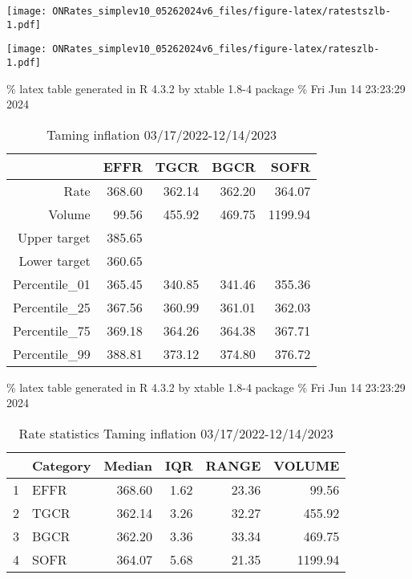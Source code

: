 \documentclass[
]{article}
\let\origfigure\figure
\let\endorigfigure\endfigure
\renewenvironment{figure}[1][2] {
    \expandafter\origfigure\expandafter[H]
} {
    \endorigfigure
}
\begin{document}
\begin{figure}
\centering
\texttt{[image: ONRates\_simplev10\_05262024v6\_files/figure-latex/ratestszlb-1.pdf]}
\caption{\label{fig:ratestszlb}Rates during zero lower bound 3/17/2020-3/16/2022}
\end{figure}

\begin{figure}
\centering
\texttt{[image: ONRates\_simplev10\_05262024v6\_files/figure-latex/rateszlb-1.pdf]}
\caption{\label{fig:rateszlb}EFFR during zero lower bound (zlb) period 3/17/2020-3/16/2022}
\end{figure}

\% latex table generated in R 4.3.2 by xtable 1.8-4 package
\% Fri Jun 14 23:23:29 2024

\begin{table}[ht]
\centering
\begin{tabular}{rrrrr}
  \hline
 & EFFR & TGCR & BGCR & SOFR \\ 
  \hline
Rate & 368.60 & 362.14 & 362.20 & 364.07 \\ 
  Volume & 99.56 & 455.92 & 469.75 & 1199.94 \\ 
  Upper target & 385.65 &  &  &  \\ 
  Lower target & 360.65 &  &  &  \\ 
  Percentile\_01 & 365.45 & 340.85 & 341.46 & 355.36 \\ 
  Percentile\_25 & 367.56 & 360.99 & 361.01 & 362.03 \\ 
  Percentile\_75 & 369.18 & 364.26 & 364.38 & 367.71 \\ 
  Percentile\_99 & 388.81 & 373.12 & 374.80 & 376.72 \\ 
   \hline
\end{tabular}
\caption{Taming inflation 03/17/2022-12/14/2023} 
\end{table}

\% latex table generated in R 4.3.2 by xtable 1.8-4 package
\% Fri Jun 14 23:23:29 2024

\begin{table}[ht]
\centering
\begin{tabular}{rlrrrr}
  \hline
 & Category & Median & IQR & RANGE & VOLUME \\ 
  \hline
1 & EFFR & 368.60 & 1.62 & 23.36 & 99.56 \\ 
  2 & TGCR & 362.14 & 3.26 & 32.27 & 455.92 \\ 
  3 & BGCR & 362.20 & 3.36 & 33.34 & 469.75 \\ 
  4 & SOFR & 364.07 & 5.68 & 21.35 & 1199.94 \\ 
   \hline
\end{tabular}
\caption{Rate statistics Taming inflation 03/17/2022-12/14/2023} 
\end{table}
\end{document}
